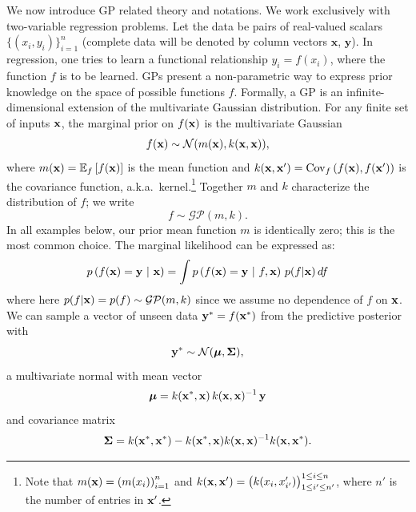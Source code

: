 

We now introduce GP related theory and notations.
We work exclusively with two-variable regression problems.
Let the data be pairs of real-valued scalars $\{(x_i,y_i)\}_{i=1}^n$ (complete data will be denoted by column vectors $\mathbf{x}$, $\mathbf{y}$).
In regression, one tries to learn a functional relationship $y_i = f(x_i)$, where the function $f$ is to be learned.
GPs present a non-parametric way to express prior knowledge on the space of possible functions $f$.
Formally, a GP is an infinite-dimensional extension of the multivariate Gaussian distribution.
For any finite set of inputs $\xbf$, the marginal prior on $f(\xbf)$ is the multivariate Gaussian
\[
f(\xbf) \sim \mathcal{N}(m(\xbf), k(\xbf,\xbf)),
\]
where $m(\xbf) = \Ebkt[f]{f(\xbf)}$ is the mean function and $k(\xbf,\xbf') = \Cov_f\pn{f(\xbf), f(\xbf')}$ is the covariance function, a.k.a.\ kernel.\footnote{
  Note that $m(\xbf) = \pn{m(x_i)}_{i=1}^{n}$ and $k(\xbf,\xbf') = \begin{pmatrix} k(x_i,x'_{i'}) \end{pmatrix}^{1 \leq i \leq n}_{1 \leq i' \leq n'}$, where $n'$ is the number of entries in $\xbf'$.
}
Together $m$ and $k$ characterize the distribution of $f$; we write
\[ f \sim \mathcal{GP}(m,k). \]
In all examples below, our prior mean function $m$ is identically zero; this is the most common choice.
The marginal likelihood can be expressed as:
\begin{equation}
\label{eq:marg}
p\pn{f(\xbf) = \ybf \mvert \xbf} = \int p\pn{f(\xbf) = \ybf \mvert f, \xbf}\, p(f|\xbf) \, df
\end{equation}
where here $p(f|\xbf) = p(f) \sim \mathcal{GP}(m,k)$ since we assume no dependence of $f$ on $\xbf$.
We can sample a vector of unseen data $\ybf^* = f(\xbf^*)$ from the predictive posterior with
\begin{equation}
\label{eq:gpsampler}
\ybf^* \sim \mathcal{N}(\bm{\mu},\bm{\Sigma}),
\end{equation}
a multivariate normal with mean vector
\begin{equation}
\label{eq:conditonalGaussianMean}
\bm{\mu} = k(\xbf^*,\xbf)\, k(\xbf,\xbf)^{-1}\, \ybf
\end{equation}
and covariance matrix
\begin{equation}
\label{eq:conditonalGaussianCovariance}
\bm{\Sigma} =  k(\xbf^*,\xbf^*) - k(\xbf^*,\xbf)k(\xbf,\xbf)^{-1} k(\xbf,\xbf^*).
\end{equation}

